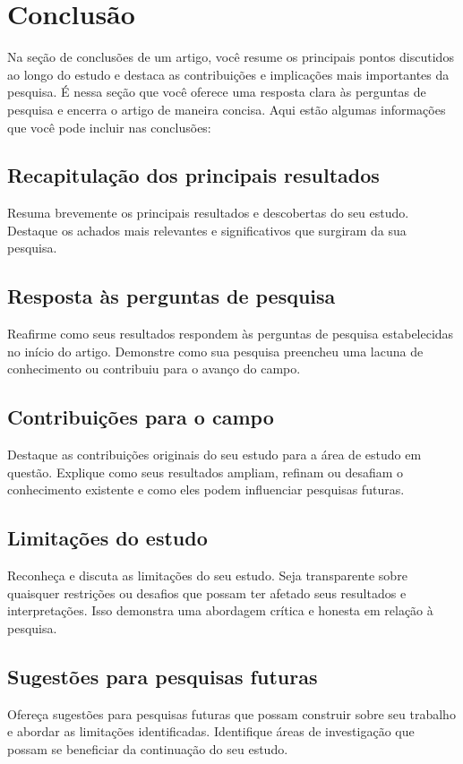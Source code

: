 \section{Conclusão}\label{:conclusion}

Na seção de conclusões de um artigo, você resume os principais pontos discutidos ao longo do estudo e destaca as contribuições e implicações mais importantes da pesquisa. É nessa seção que você oferece uma resposta clara às perguntas de pesquisa e encerra o artigo de maneira concisa. Aqui estão algumas informações que você pode incluir nas conclusões:

\subsection{Recapitulação dos principais resultados}
Resuma brevemente os principais resultados e descobertas do seu estudo. Destaque os achados mais relevantes e significativos que surgiram da sua pesquisa.

\subsection{Resposta às perguntas de pesquisa}
Reafirme como seus resultados respondem às perguntas de pesquisa estabelecidas no início do artigo. Demonstre como sua pesquisa preencheu uma lacuna de conhecimento ou contribuiu para o avanço do campo.

\subsection{Contribuições para o campo}
Destaque as contribuições originais do seu estudo para a área de estudo em questão. Explique como seus resultados ampliam, refinam ou desafiam o conhecimento existente e como eles podem influenciar pesquisas futuras.

\subsection{Limitações do estudo}
Reconheça e discuta as limitações do seu estudo. Seja transparente sobre quaisquer restrições ou desafios que possam ter afetado seus resultados e interpretações. Isso demonstra uma abordagem crítica e honesta em relação à pesquisa.

\subsection{Sugestões para pesquisas futuras}
Ofereça sugestões para pesquisas futuras que possam construir sobre seu trabalho e abordar as limitações identificadas. Identifique áreas de investigação que possam se beneficiar da continuação do seu estudo.

